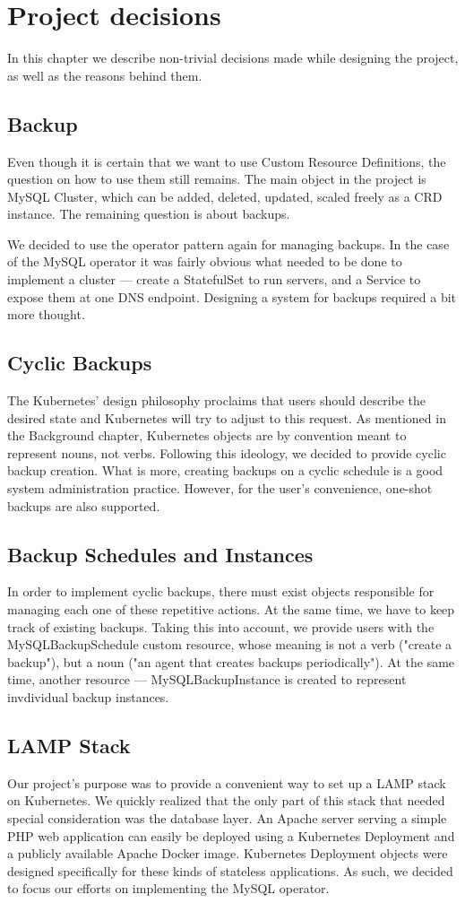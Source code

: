 \chapter{Project decisions}
In this chapter we describe non-trivial decisions made while designing the project, as well as the
reasons behind them.

\section{Backup}
Even though it is certain that we want to use Custom Resource Definitions, the question on how to
use them still remains. The main object in the project is MySQL Cluster, which can be added,
deleted, updated, scaled freely as a CRD instance. The remaining question is about backups.

We decided to use the operator pattern again for managing backups. In the case of the MySQL
operator it was fairly obvious what needed to be done to implement a cluster --- create a
StatefulSet to run servers, and a Service to expose them at one DNS endpoint. Designing a system
for backups required a bit more thought.

\section{Cyclic Backups}
The Kubernetes’ design philosophy proclaims that users should describe the desired state and
Kubernetes will try to adjust to this request. As mentioned in the Background chapter, Kubernetes 
objects are by convention meant to represent nouns, not verbs. Following this ideology, we 
decided to provide cyclic backup creation. What is more, creating backups on a cyclic schedule 
is a good system administration practice. However, for the user’s convenience, one-shot backups are 
also supported.

\section{Backup Schedules and Instances}
In order to implement cyclic backups, there must exist objects responsible for managing each one of
these repetitive actions. At the same time, we have to keep track of existing backups. Taking this
into account, we provide users with the MySQLBackupSchedule custom resource, whose meaning is not a
verb ("create a backup"), but a noun ("an agent that creates backups periodically"). At the same
time, another resource --- MySQLBackupInstance is created to represent invdividual backup instances.

\section{LAMP Stack}
Our project’s purpose was to provide a convenient way to set up a LAMP
stack on Kubernetes. We quickly realized that the only part of this stack that needed special
consideration was the database layer. An Apache server serving a simple PHP web application can
easily be deployed using a Kubernetes Deployment and a publicly available Apache Docker image.
Kubernetes Deployment objects were designed specifically for these kinds of stateless applications.
As such, we decided to focus our efforts on implementing the MySQL operator.
